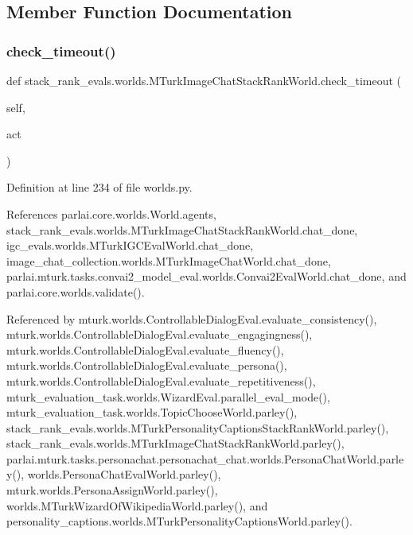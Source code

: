 \subsection{Member Function Documentation}
\mbox{\label{classstack__rank__evals_1_1worlds_1_1MTurkImageChatStackRankWorld_a9c6f889227e1aec6ad1dbaa4150b1625}} 
\subsubsection{\texorpdfstring{check\+\_\+timeout()}{check\_timeout()}}
{\footnotesize\ttfamily def stack\+\_\+rank\+\_\+evals.\+worlds.\+M\+Turk\+Image\+Chat\+Stack\+Rank\+World.\+check\+\_\+timeout (\begin{DoxyParamCaption}\item[{}]{self,  }\item[{}]{act }\end{DoxyParamCaption})}



Definition at line 234 of file worlds.\+py.



References parlai.\+core.\+worlds.\+World.\+agents, stack\+\_\+rank\+\_\+evals.\+worlds.\+M\+Turk\+Image\+Chat\+Stack\+Rank\+World.\+chat\+\_\+done, igc\+\_\+evals.\+worlds.\+M\+Turk\+I\+G\+C\+Eval\+World.\+chat\+\_\+done, image\+\_\+chat\+\_\+collection.\+worlds.\+M\+Turk\+Image\+Chat\+World.\+chat\+\_\+done, parlai.\+mturk.\+tasks.\+convai2\+\_\+model\+\_\+eval.\+worlds.\+Convai2\+Eval\+World.\+chat\+\_\+done, and parlai.\+core.\+worlds.\+validate().



Referenced by mturk.\+worlds.\+Controllable\+Dialog\+Eval.\+evaluate\+\_\+consistency(), mturk.\+worlds.\+Controllable\+Dialog\+Eval.\+evaluate\+\_\+engagingness(), mturk.\+worlds.\+Controllable\+Dialog\+Eval.\+evaluate\+\_\+fluency(), mturk.\+worlds.\+Controllable\+Dialog\+Eval.\+evaluate\+\_\+persona(), mturk.\+worlds.\+Controllable\+Dialog\+Eval.\+evaluate\+\_\+repetitiveness(), mturk\+\_\+evaluation\+\_\+task.\+worlds.\+Wizard\+Eval.\+parallel\+\_\+eval\+\_\+mode(), mturk\+\_\+evaluation\+\_\+task.\+worlds.\+Topic\+Choose\+World.\+parley(), stack\+\_\+rank\+\_\+evals.\+worlds.\+M\+Turk\+Personality\+Captions\+Stack\+Rank\+World.\+parley(), stack\+\_\+rank\+\_\+evals.\+worlds.\+M\+Turk\+Image\+Chat\+Stack\+Rank\+World.\+parley(), parlai.\+mturk.\+tasks.\+personachat.\+personachat\+\_\+chat.\+worlds.\+Persona\+Chat\+World.\+parley(), worlds.\+Persona\+Chat\+Eval\+World.\+parley(), mturk.\+worlds.\+Persona\+Assign\+World.\+parley(), worlds.\+M\+Turk\+Wizard\+Of\+Wikipedia\+World.\+parley(), and personality\+\_\+captions.\+worlds.\+M\+Turk\+Personality\+Captions\+World.\+parley().

